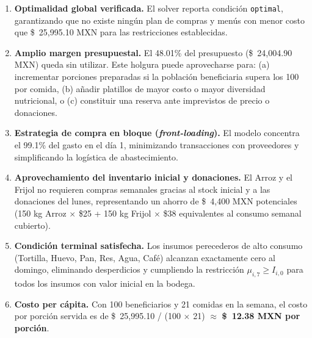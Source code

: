 \documentclass[12pt]{report}
\begin{document}
\begin{enumerate}
    \item \textbf{Optimalidad global verificada.} El solver reporta condición \texttt{optimal},
          garantizando que no existe ningún plan de compras y menús con menor costo que
          \$~25{,}995.10 MXN para las restricciones establecidas.

    \item \textbf{Amplio margen presupuestal.} El 48.01\% del presupuesto (\$~24{,}004.90 MXN)
          queda sin utilizar. Este holgura puede aprovecharse para: (a) incrementar porciones
          preparadas si la población beneficiaria supera los 100 por comida, (b) añadir platillos
          de mayor costo o mayor diversidad nutricional, o (c) constituir una reserva ante
          imprevistos de precio o donaciones.

    \item \textbf{Estrategia de compra en bloque (\emph{front-loading}).} El modelo concentra
          el 99.1\% del gasto en el día 1, minimizando transacciones con proveedores y
          simplificando la logística de abastecimiento.

    \item \textbf{Aprovechamiento del inventario inicial y donaciones.} El Arroz y el Frijol
          no requieren compras semanales gracias al stock inicial y a las donaciones del
          lunes, representando un ahorro de \$~4{,}400 MXN potenciales (150 kg Arroz $\times$
          \$25 + 150 kg Frijol $\times$ \$38 equivalentes al consumo semanal cubierto).

    \item \textbf{Condición terminal satisfecha.} Los insumos perecederos de alto consumo
          (Tortilla, Huevo, Pan, Res, Agua, Café) alcanzan exactamente cero al domingo,
          eliminando desperdicios y cumpliendo la restricción $\mu_{i,7} \geq I_{i,0}$
          para todos los insumos con valor inicial en la bodega.

    \item \textbf{Costo per cápita.} Con 100 beneficiarios y 21 comidas en la semana, el
          costo por porción servida es de \$~25{,}995.10 / (100 $\times$ 21)
          $\approx$ \textbf{\$~12.38 MXN por porción}.
\end{enumerate}


\nocite{*}

\printbibliography
\end{document}
